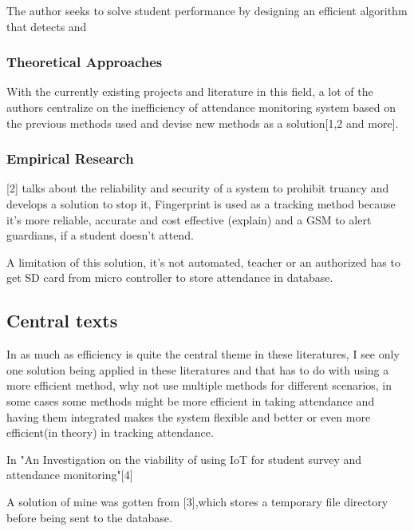 The author seeks to solve student performance by designing an efficient algorithm that detects and 


\subsubsection{Theoretical Approaches}
With the currently existing projects and literature in this field, a lot of the authors centralize on the inefficiency of attendance monitoring system based on the previous methods used and devise new methods as a solution[1,2 and more]. 

\subsubsection{Empirical Research}
[2] talks about the reliability and security of a system to prohibit truancy and develops a solution to stop it, Fingerprint is used as a tracking method because it's more reliable, accurate and cost effective (explain) and a GSM to alert guardians, if a student doesn't attend.

A limitation of this solution, it's not automated, teacher or an authorized has to get SD card from micro controller to store attendance in database.


\subsection{Central texts}

In as much as efficiency is quite the central theme in these literatures, I see only one solution being applied in these literatures and that has to do with using a more efficient method, why not use multiple methods for different scenarios, in some cases some methods might be more efficient in taking attendance and having them integrated makes the system flexible and better or even more efficient(in theory) in tracking attendance.

In "An Investigation on the viability of using IoT for student survey and attendance monitoring"[4]



A solution of mine was gotten from [3],which stores a temporary file directory before being sent to the database.
